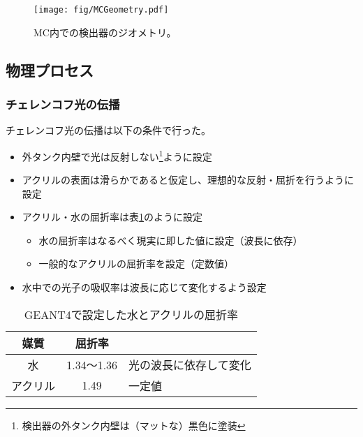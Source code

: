 \documentclass[11pt]{jreport}
\newcommand{\tabref}[1]{表\ref{#1}}
\newcommand{\red}[1]{\textcolor{red}{\textbf{#1}}}
\newcommand{\comment}[1]{\red{#1}\footnote{\red{#1}}}
\begin{document}
\begin{figure}[htbp]
\centering
\texttt{[image: fig/MCGeometry.pdf]}
\caption[MC内での検出器のジオメトリ]{MC内での検出器のジオメトリ。}
\label{MCGeometry}
\end{figure}

\subsection{物理プロセス}

\subsubsection{チェレンコフ光の伝播}
チェレンコフ光の伝播は以下の条件で行った。

\begin{itemize}
\item 外タンク内壁で光は反射しない\footnote{検出器の外タンク内壁は（マットな）黒色に塗装}ように設定
\item アクリルの表面は滑らかであると仮定し、理想的な反射・屈折を行うように設定
\item アクリル・水の屈折率は\tabref{RefractiveIndex}のように設定
	\begin{itemize}
	\item 水の屈折率はなるべく現実に即した値に設定（波長に依存）
	\item 一般的なアクリルの屈折率を設定（定数値）
	\end{itemize}
\item 水中での光子の吸収率は波長に応じて変化するよう設定
\end{itemize}


\begin{table}[htbp]
\caption[GEANT4で設定した水とアクリルの屈折率]{GEANT4で設定した水とアクリルの屈折率}
\begin{center}
\begin{tabular}{ccl}
\hline \hline
媒質 & 屈折率 & \\
\hline
水 & 1.34〜1.36 & 光の波長に依存して変化\\%
アクリル & 1.49 & 一定値\\
\hline \hline
\end{tabular}
\end{center}
\label{RefractiveIndex}
\end{table}%
\end{document}
